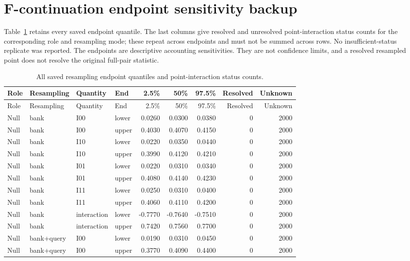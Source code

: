 \section{F-continuation endpoint sensitivity backup}\label{app:f-endpoints}
Table~\ref{tab:f-all-endpoints} retains every saved endpoint quantile.
The last columns give resolved and unresolved point-interaction status counts
for the corresponding role and resampling mode; these repeat across endpoints
and must not be summed across rows. No insufficient-status replicate was
reported. The endpoints are descriptive accounting sensitivities. They are not
confidence limits, and a resolved resampled point does not resolve the original
full-pair statistic.

{\small
\setlength{\tabcolsep}{3pt}
\begin{longtable}{llllrrrrr}
\caption{All saved resampling endpoint quantiles and point-interaction status counts.}\label{tab:f-all-endpoints}\\
\toprule
Role & Resampling & Quantity & End & 2.5\% & 50\% & 97.5\% & Resolved & Unknown\\\midrule
\endfirsthead
\toprule
Role & Resampling & Quantity & End & 2.5\% & 50\% & 97.5\% & Resolved & Unknown\\\midrule
\endhead
Null & bank & I00 & lower & 0.0260 & 0.0300 & 0.0380 & 0 & 2000\\
Null & bank & I00 & upper & 0.4030 & 0.4070 & 0.4150 & 0 & 2000\\
Null & bank & I10 & lower & 0.0220 & 0.0350 & 0.0440 & 0 & 2000\\
Null & bank & I10 & upper & 0.3990 & 0.4120 & 0.4210 & 0 & 2000\\
Null & bank & I01 & lower & 0.0220 & 0.0310 & 0.0340 & 0 & 2000\\
Null & bank & I01 & upper & 0.4080 & 0.4140 & 0.4230 & 0 & 2000\\
Null & bank & I11 & lower & 0.0250 & 0.0310 & 0.0400 & 0 & 2000\\
Null & bank & I11 & upper & 0.4060 & 0.4110 & 0.4200 & 0 & 2000\\
Null & bank & interaction & lower & -0.7770 & -0.7640 & -0.7510 & 0 & 2000\\
Null & bank & interaction & upper & 0.7420 & 0.7560 & 0.7700 & 0 & 2000\\
Null & bank+query & I00 & lower & 0.0190 & 0.0310 & 0.0450 & 0 & 2000\\
Null & bank+query & I00 & upper & 0.3770 & 0.4090 & 0.4400 & 0 & 2000\\

\end{longtable}}
